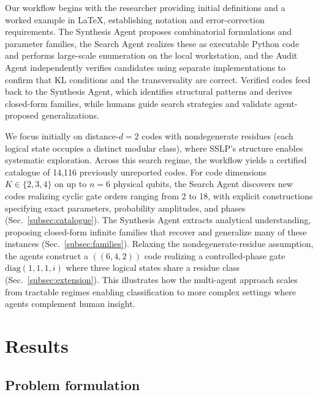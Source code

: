 \documentclass[pdflatex,sn-nature]{sn-jnl}%
\theoremstyle{thmstyleone}%
\theoremstyle{thmstyletwo}%
\theoremstyle{thmstylethree}%
\begin{document}
Our workflow begins with the researcher providing initial definitions and a worked example in LaTeX, establishing notation and error-correction requirements. The Synthesis Agent proposes combinatorial formulations and parameter families, the Search Agent realizes these as executable Python code and performs large-scale enumeration on the local workstation, and the Audit Agent independently verifies candidates using separate implementations to confirm that KL conditions and the transversality are correct. Verified codes feed back to the Synthesis Agent, which identifies structural patterns and derives closed-form families, while humans guide search strategies and validate agent-proposed generalizations.

We focus initially on distance-$d=2$ codes with nondegenerate residues (each logical state occupies a distinct modular class), where SSLP's structure enables systematic exploration. Across this search regime, the workflow yields a certified catalogue of 14,116 previously unreported codes. For code dimensions $K{\in}\{2,3,4\}$ on up to $n=6$ physical qubits, the Search Agent discovers new codes realizing cyclic gate orders ranging from 2 to 18, with explicit constructions specifying exact parameters, probability amplitudes, and phases (Sec.~\ref{subsec:catalogue}). The Synthesis Agent extracts analytical understanding, proposing closed-form infinite families that recover and generalize many of these instances (Sec.~\ref{subsec:families}). Relaxing the nondegenerate-residue assumption, the agents construct a $((6,4,2))$ code realizing a controlled-phase gate $\mathrm{diag}(1,1,1,i)$ where three logical states share a residue class (Sec.~\ref{subsec:extension}). This illustrates how the multi-agent approach scales from tractable regimes enabling classification to more complex settings where agents complement human insight.

\section{Results}
\label{sec:results}

\subsection{Problem formulation}
\label{subsec:formulation}
\end{document}
